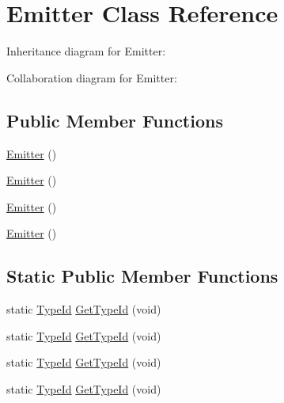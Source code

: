 \hypertarget{classEmitter}{}\section{Emitter Class Reference}
\label{classEmitter}


Inheritance diagram for Emitter\+:


Collaboration diagram for Emitter\+:
\subsection*{Public Member Functions}
\begin{DoxyCompactItemize}
\item 
\hyperlink{classEmitter_abf64c2bcea8e7f44d41998c63dd17445}{Emitter} ()
\item 
\hyperlink{classEmitter_abf64c2bcea8e7f44d41998c63dd17445}{Emitter} ()
\item 
\hyperlink{classEmitter_abf64c2bcea8e7f44d41998c63dd17445}{Emitter} ()
\item 
\hyperlink{classEmitter_abf64c2bcea8e7f44d41998c63dd17445}{Emitter} ()
\end{DoxyCompactItemize}
\subsection*{Static Public Member Functions}
\begin{DoxyCompactItemize}
\item 
static \hyperlink{classns3_1_1TypeId}{Type\+Id} \hyperlink{classEmitter_af3e749a2a55f296bd9c04386248e1913}{Get\+Type\+Id} (void)
\item 
static \hyperlink{classns3_1_1TypeId}{Type\+Id} \hyperlink{classEmitter_a000c7b12b3388cfe1a303ae883af5525}{Get\+Type\+Id} (void)
\item 
static \hyperlink{classns3_1_1TypeId}{Type\+Id} \hyperlink{classEmitter_a000c7b12b3388cfe1a303ae883af5525}{Get\+Type\+Id} (void)
\item 
static \hyperlink{classns3_1_1TypeId}{Type\+Id} \hyperlink{classEmitter_a000c7b12b3388cfe1a303ae883af5525}{Get\+Type\+Id} (void)
\end{DoxyCompactItemize}
